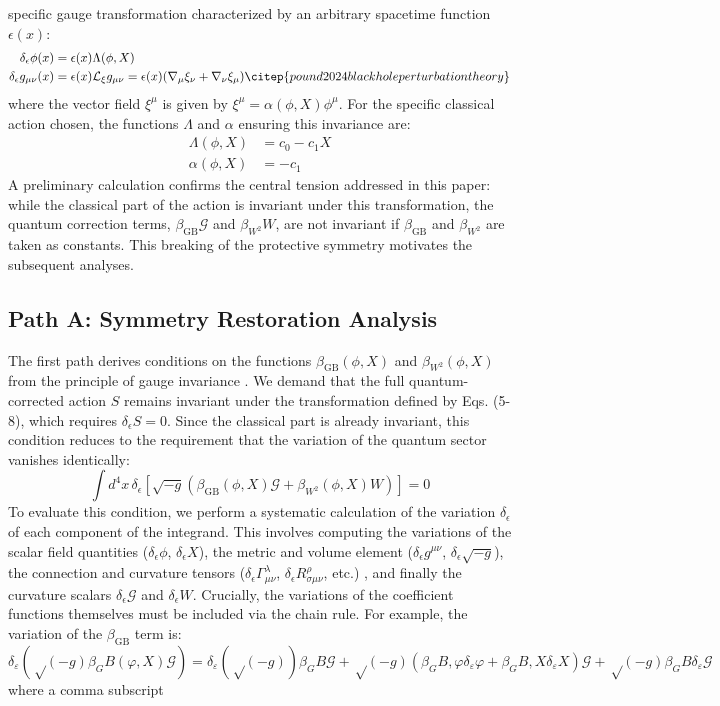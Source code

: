 \documentclass[twocolumn]{aastex631}
\begin{document}
specific gauge transformation characterized by an arbitrary spacetime function $\epsilon(x)$:\begin{align}\delta_\epsilon \phi(x) &= \epsilon(x) \Lambda(\phi, X) \\\delta_\epsilon g_{\mu\nu}(x) &= \epsilon(x) \mathcal{L}_{\xi} g_{\mu\nu} = \epsilon(x) (\nabla_\mu \xi_\nu + \nabla_\nu \xi_\mu) \citep{pound2024blackholeperturbationtheory}\end{align}where the vector field $\xi^\mu$ is given by $\xi^\mu = \alpha(\phi, X) \phi^\mu$. For the specific classical action chosen, the functions $\Lambda$ and $\alpha$ ensuring this invariance are:\begin{align}\Lambda(\phi, X) &= c_0 - c_1 X \\\alpha(\phi, X) &= -c_1\end{align}A preliminary calculation confirms the central tension addressed in this paper: while the classical part of the action is invariant under this transformation, the quantum correction terms, $\beta_{\text{GB}}\mathcal{G}$ and $\beta_{W^2}W$, are not invariant if $\beta_{\text{GB}}$ and $\beta_{W^2}$ are taken as constants. This breaking of the protective symmetry motivates the subsequent analyses.\subsection{Path A: Symmetry Restoration Analysis}The first path derives conditions on the functions $\beta_{\text{GB}}(\phi, X)$ and $\beta_{W^2}(\phi, X)$ from the principle of gauge invariance \citep{savasta2020gaugeprinciplegaugeinvariance}. We demand that the full quantum-corrected action $S$ remains invariant under the transformation defined by Eqs. (5-8), which requires $\delta_\epsilon S = 0$. Since the classical part is already invariant, this condition reduces to the requirement that the variation of the quantum sector vanishes identically:\begin{equation}\int d^4x \, \delta_\epsilon \left[ \sqrt{-g} \left( \beta_{\text{GB}}(\phi, X) \mathcal{G} + \beta_{W^2}(\phi, X) W \right) \right] = 0\end{equation}To evaluate this condition, we perform a systematic calculation of the variation $\delta_\epsilon$ of each component of the integrand. This involves computing the variations of the scalar field quantities ($\delta_\epsilon \phi$, $\delta_\epsilon X$), the metric and volume element ($\delta_\epsilon g^{\mu\nu}$, $\delta_\epsilon \sqrt{-g}$), the connection and curvature tensors ($\delta_\epsilon \Gamma^\lambda_{\mu\nu}$, $\delta_\epsilon R^\rho_{\sigma\mu\nu}$, etc.) \citep{davis1996symmetricvariationsmetricextrema,guarnizo2010boundarytermmetricfr,tamanini2012variationalapproachgravitationaltheories}, and finally the curvature scalars $\delta_\epsilon \mathcal{G}$ and $\delta_\epsilon W$. Crucially, the variations of the coefficient functions themselves must be included via the chain rule. For example, the variation of the $\beta_{\text{GB}}$ term is:\begin{equation}δ_ε(√(-g)β_GB(φ, X)𝒢) = δ_ε(√(-g))β_GB𝒢 + √(-g)(β_GB,φδ_εφ + β_GB,Xδ_εX)𝒢 + √(-g)β_GBδ_ε𝒢\end{equation}where a comma subscript 
\end{document}
